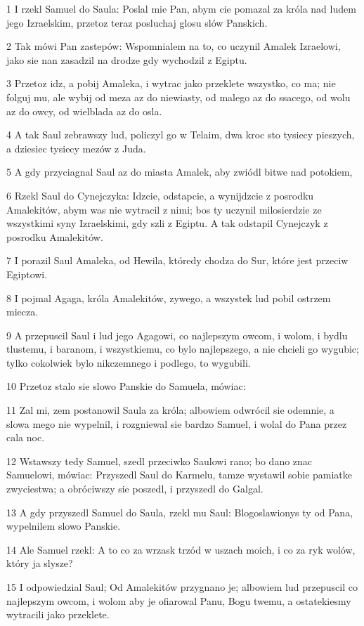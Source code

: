 \par 1 I rzekl Samuel do Saula: Poslal mie Pan, abym cie pomazal za króla nad ludem jego Izraelskim, przetoz teraz posluchaj glosu slów Panskich.
\par 2 Tak mówi Pan zastepów: Wspomnialem na to, co uczynil Amalek Izraelowi, jako sie nan zasadzil na drodze gdy wychodzil z Egiptu.
\par 3 Przetoz idz, a pobij Amaleka, i wytrac jako przeklete wszystko, co ma; nie folguj mu, ale wybij od meza az do niewiasty, od malego az do ssacego, od wolu az do owcy, od wielblada az do osla.
\par 4 A tak Saul zebrawszy lud, policzyl go w Telaim, dwa kroc sto tysiecy pieszych, a dziesiec tysiecy mezów z Juda.
\par 5 A gdy przyciagnal Saul az do miasta Amalek, aby zwiódl bitwe nad potokiem,
\par 6 Rzekl Saul do Cynejczyka: Idzcie, odstapcie, a wynijdzcie z posrodku Amalekitów, abym was nie wytracil z nimi; bos ty uczynil milosierdzie ze wszystkimi syny Izraelskimi, gdy szli z Egiptu. A tak odstapil Cynejczyk z posrodku Amalekitów.
\par 7 I porazil Saul Amaleka, od Hewila, któredy chodza do Sur, które jest przeciw Egiptowi.
\par 8 I pojmal Agaga, króla Amalekitów, zywego, a wszystek lud pobil ostrzem miecza.
\par 9 A przepuscil Saul i lud jego Agagowi, co najlepszym owcom, i wolom, i bydlu tlustemu, i baranom, i wszystkiemu, co bylo najlepszego, a nie chcieli go wygubic; tylko cokolwiek bylo nikczemnego i podlego, to wygubili.
\par 10 Przetoz stalo sie slowo Panskie do Samuela, mówiac:
\par 11 Zal mi, zem postanowil Saula za króla; albowiem odwrócil sie odemnie, a slowa mego nie wypelnil, i rozgniewal sie bardzo Samuel, i wolal do Pana przez cala noc.
\par 12 Wstawszy tedy Samuel, szedl przeciwko Saulowi rano; bo dano znac Samuelowi, mówiac: Przyszedl Saul do Karmelu, tamze wystawil sobie pamiatke zwyciestwa; a obróciwszy sie poszedl, i przyszedl do Galgal.
\par 13 A gdy przyszedl Samuel do Saula, rzekl mu Saul: Blogoslawionys ty od Pana, wypelnilem slowo Panskie.
\par 14 Ale Samuel rzekl: A to co za wrzask trzód w uszach moich, i co za ryk wolów, który ja slysze?
\par 15 I odpowiedzial Saul; Od Amalekitów przygnano je; albowiem lud przepuscil co najlepszym owcom, i wolom aby je ofiarowal Panu, Bogu twemu, a ostatekiesmy wytracili jako przeklete.
